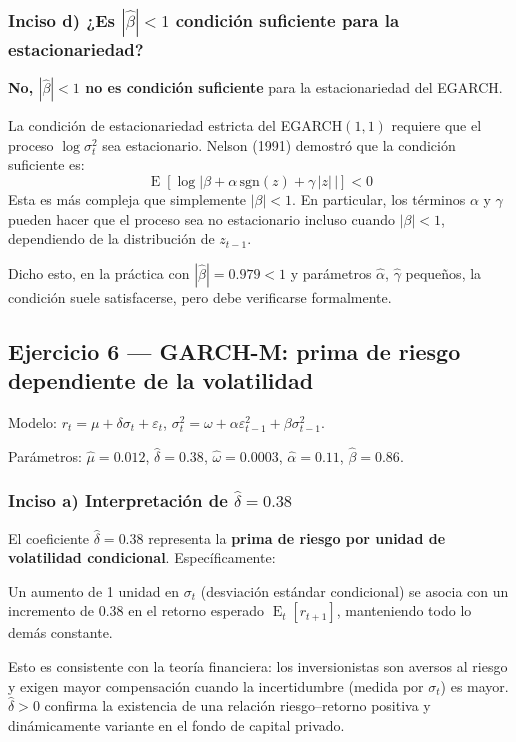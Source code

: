\documentclass[12pt,a4paper]{article}
\DeclareMathOperator{\E}{E}
\begin{document}
\subsubsection*{Inciso d) ¿Es $|\hat{\beta}|<1$ condición suficiente para la estacionariedad?}

\begin{solucion}
\textbf{No, $|\hat{\beta}|<1$ no es condición suficiente} para la estacionariedad del EGARCH.

La condición de estacionariedad estricta del EGARCH$(1,1)$ requiere que el proceso $\log\sigma_t^2$ sea estacionario. Nelson (1991) demostró que la condición suficiente es:
\begin{equation}
\E\left[\log|\beta + \alpha\,\text{sgn}(z)+\gamma\,|z|\,|\right] < 0
\end{equation}
Esta es más compleja que simplemente $|\beta|<1$. En particular, los términos $\alpha$ y $\gamma$ pueden hacer que el proceso sea no estacionario incluso cuando $|\beta|<1$, dependiendo de la distribución de $z_{t-1}$.

Dicho esto, en la práctica con $|\hat{\beta}|=0.979<1$ y parámetros $\hat{\alpha}$, $\hat{\gamma}$ pequeños, la condición suele satisfacerse, pero debe verificarse formalmente.
\end{solucion}

\subsection{Ejercicio 6 — GARCH-M: prima de riesgo dependiente de la volatilidad}

Modelo: $r_t = \mu + \delta\sigma_t + \varepsilon_t$, $\sigma_t^2=\omega+\alpha\varepsilon_{t-1}^2+\beta\sigma_{t-1}^2$.

Parámetros: $\hat{\mu}=0.012$, $\hat{\delta}=0.38$, $\hat{\omega}=0.0003$, $\hat{\alpha}=0.11$, $\hat{\beta}=0.86$.

\subsubsection*{Inciso a) Interpretación de $\hat{\delta}=0.38$}

\begin{solucion}
El coeficiente $\hat{\delta}=0.38$ representa la \textbf{prima de riesgo por unidad de volatilidad condicional}. Específicamente:

Un aumento de 1 unidad en $\sigma_t$ (desviación estándar condicional) se asocia con un incremento de $0.38$ en el retorno esperado $\E_t[r_{t+1}]$, manteniendo todo lo demás constante.

Esto es consistente con la teoría financiera: los inversionistas son aversos al riesgo y exigen mayor compensación cuando la incertidumbre (medida por $\sigma_t$) es mayor. $\hat{\delta}>0$ confirma la existencia de una relación riesgo–retorno positiva y dinámicamente variante en el fondo de capital privado.
\end{solucion}
\end{document}
